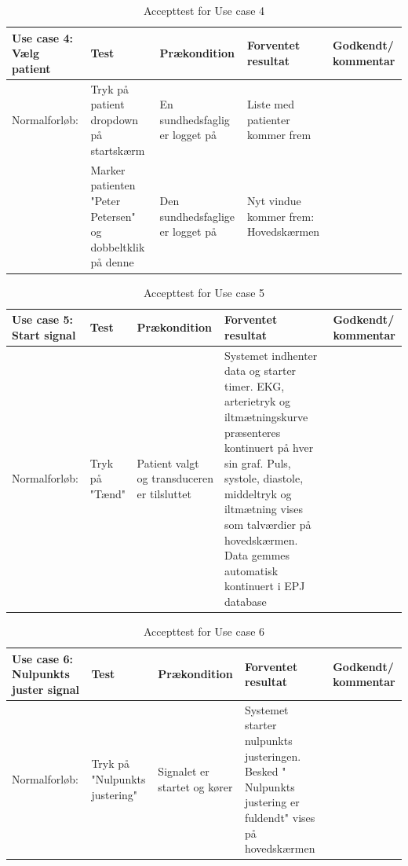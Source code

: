 \begin{table}[H]
\caption{Accepttest for Use case 4}\label{tab:tabel8}
\begin{tabular}{|>{\raggedright\arraybackslash}p{2.5cm}| >{\raggedright\arraybackslash}p{2.9cm} | >{\raggedright\arraybackslash}p{2.9cm} | >{\raggedright\arraybackslash}p{2.9cm} | >{\raggedright\arraybackslash}p{2.8cm} |}
   \hline
   \textbf{Use case 4: Vælg patient} &\textbf{Test}& \textbf{Prækondition} & \textbf{Forventet resultat} & \textbf{Godkendt/ kommentar}\\ \hline
   Normalforløb:& Tryk på patient dropdown på startskærm & En sundhedsfaglig er logget på & Liste med patienter kommer frem  & \\\hline
   & Marker patienten "Peter Petersen" og dobbeltklik på denne & Den sundhedsfaglige er logget på & Nyt vindue kommer frem: Hovedskærmen &\\\hline
\end{tabular}
\end{table}


\begin{table}[H]
\caption{Accepttest for Use case 5}\label{tab:tabel8}
\begin{tabular}{|>{\raggedright\arraybackslash}p{2.5cm}| >{\raggedright\arraybackslash}p{2.9cm} | >{\raggedright\arraybackslash}p{2.9cm} | >{\raggedright\arraybackslash}p{2.9cm} | >{\raggedright\arraybackslash}p{2.8cm} |}
   \hline
   \textbf{Use case 5: Start signal} &\textbf{Test}& \textbf{Prækondition} & \textbf{Forventet resultat} & \textbf{Godkendt/ kommentar}\\ \hline
   Normalforløb:& Tryk på "Tænd"& Patient valgt og transduceren er tilsluttet & Systemet indhenter data og starter timer. EKG, arterietryk og iltmætningskurve præsenteres kontinuert på hver sin graf. Puls, systole, diastole, middeltryk og iltmætning vises som talværdier på hovedskærmen. Data gemmes automatisk kontinuert i EPJ database & \\\hline
\end{tabular}
\end{table}

\begin{table}[H]
\caption{Accepttest for Use case 6}\label{tab:tabel8}
\begin{tabular}{|>{\raggedright\arraybackslash}p{2.5cm}| >{\raggedright\arraybackslash}p{2.9cm} | >{\raggedright\arraybackslash}p{2.9cm} | >{\raggedright\arraybackslash}p{2.9cm} | >{\raggedright\arraybackslash}p{2.8cm} |}
   \hline
   \textbf{Use case 6: Nulpunkts juster signal } &\textbf{Test}& \textbf{Prækondition} & \textbf{Forventet resultat} & \textbf{Godkendt/ kommentar}\\ \hline
   Normalforløb:& Tryk på "Nulpunkts justering" & Signalet er startet og kører & Systemet starter nulpunkts justeringen. Besked " Nulpunkts justering er fuldendt" vises på hovedskærmen &\\\hline
\end{tabular}
\end{table}



